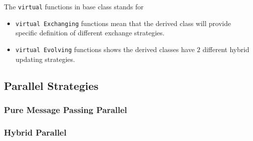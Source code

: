 The \texttt{virtual} functions in base class stands for
\begin{itemize}
  \item \texttt{virtual Exchanging} functions mean that the derived class will provide specific definition of different exchange strategies.
  \item \texttt{virtual Evolving} functions shows the derived classes have $2$ different hybrid updating strategies.
\end{itemize}


\subsection{Parallel Strategies}
\subsubsection{Pure Message Passing Parallel}
\subsubsection{Hybrid Parallel}


